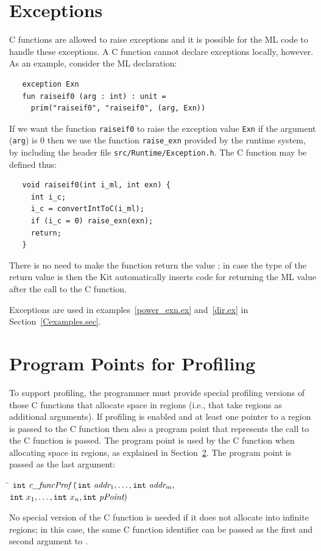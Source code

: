 \documentclass[12pt]{book}
\begin{document}
\section{Exceptions}
\label{C_exceptions.sec}
C functions are allowed to raise exceptions and it is possible for the
ML code to handle these exceptions. A C function cannot declare
exceptions locally, however. As an example, consider the ML
declaration:
\begin{verbatim}
   exception Exn
   fun raiseif0 (arg : int) : unit = 
     prim("raiseif0", "raiseif0", (arg, Exn))
\end{verbatim}
If we want the function \texttt{raiseif0} to raise the exception value
\texttt{Exn} if the argument (\texttt{arg}) is 0 then we use the
function \verb|raise_exn| provided by the runtime system, by
including the header file {\tt src/Runtime/Exception.h}. The C
function  may be defined thus:
\begin{verbatim}
   void raiseif0(int i_ml, int exn) {
     int i_c;
     i_c = convertIntToC(i_ml);
     if (i_c = 0) raise_exn(exn);
     return;
   }
\end{verbatim}
There is no need to make the function return the value ;
in case the type of the return value is  then the Kit
automatically inserts code for returning the ML value \boxml{()} after
the call to the C function.

Exceptions are used in examples~\ref{power_exn.ex} and~\ref{dir.ex} in
Section~\ref{Cexamples.sec}.

\section{Program Points for Profiling}
\label{prof.sec}
To support profiling, the programmer must provide special profiling
versions of those C functions that allocate space in regions (i.e.,
that take regions as additional arguments). If profiling is enabled
and at least one pointer to a region is passed to the C function then
also a program point that represents the call to the C function is
passed.  The program point is used by the C function when allocating
space in regions, as explained in Section~\ref{prof.sec}. The program
point is passed as the last argument:
\begin{tabbing}
\indent\=  $\texttt{int} \ \emph{c\_funcProf} \ ($\=$\texttt{int}\ \emph{addr}_1,
    \ldots, \texttt{int}\ \emph{addr}_m,$\\
  \>\>$ \texttt{int}\ x_1, \ldots,
    \texttt{int}\ x_n, \texttt{int}\ \emph{pPoint}) $
\end{tabbing}
\noindent
No special version of the C function is needed if it does not allocate
into infinite regions; in this case, the same C function identifier can be
passed as the first and second argument to .
\end{document}
